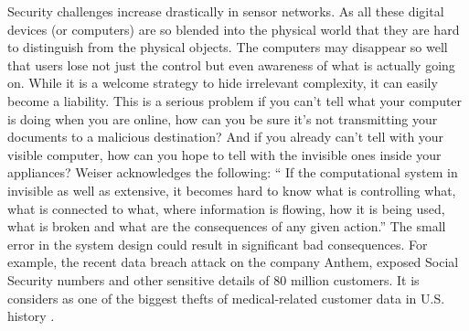 	Security challenges increase drastically in sensor networks. 
	As all these digital devices (or computers) are so blended into the physical world that they are hard to distinguish from the physical objects.
	The computers may disappear so well that users lose not just the control but even awareness of what is actually going on.
	While it is a welcome strategy to hide irrelevant complexity, it can easily become a liability.
	This is a serious problem if you can't tell what your computer is doing when you are online, how can you be sure it's not transmitting your documents to a malicious destination? 
	And if you already can't tell with your visible computer, how can you hope to tell with the invisible ones inside your appliances? 
	Weiser \cite{weiser1999origins} acknowledges the following: 
	``	If the computational system in invisible as well as extensive, it becomes hard to know what is controlling what, what is connected to what, where information is flowing, how it is being used, what is broken and what are the consequences of any given action.''
	The small error in the system design could result in significant bad consequences.
	For example, the recent data breach attack on the company Anthem, exposed Social Security numbers and other sensitive details of 80 million customers.
	It is considers as one of the biggest thefts of medical-related customer data in U.S. history \cite{anthem}. 

